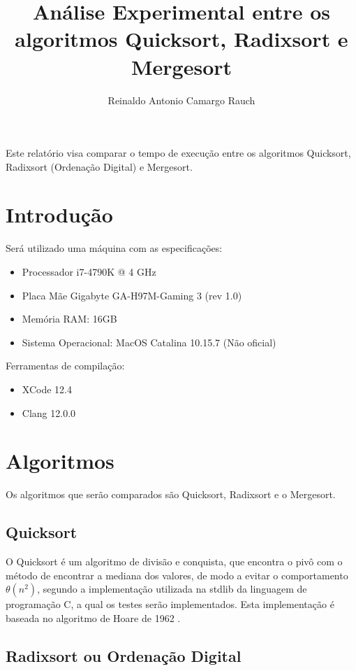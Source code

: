 \documentclass[12pt]{article}
\title{Análise Experimental entre os algoritmos Quicksort, Radixsort  e Mergesort}
\author{Reinaldo Antonio Camargo Rauch\inst{1}}
\begin{document}
\maketitle

\begin{resumo}
Este relatório visa comparar o tempo de execução entre os algoritmos Quicksort, Radixsort (Ordenação Digital) e Mergesort.
\end{resumo}

\section{Introdução}

Será utilizado uma máquina com as especificações:

\begin{itemize}
  \item Processador i7-4790K @ 4 GHz
  \item Placa Mãe Gigabyte GA-H97M-Gaming 3 (rev 1.0)
  \item Memória RAM: 16GB
  \item Sistema Operacional: MacOS Catalina 10.15.7 (Não oficial)
\end{itemize}


Ferramentas de compilação:

\begin{itemize}
  \item XCode 12.4
  \item Clang 12.0.0
\end{itemize}

\section{Algoritmos}

Os algoritmos que serão comparados são Quicksort, Radixsort e o Mergesort.

\subsection{Quicksort}

O Quicksort é um algoritmo de divisão e conquista, que encontra o pivô com o método de encontrar a mediana dos valores, de modo a evitar o comportamento $\theta{(n^2)}$, segundo a implementação utilizada na stdlib da linguagem de programação C, a qual os testes serão implementados. Esta implementação é baseada no algoritmo de Hoare de 1962 \cite{quicksort:21}.

\subsection{Radixsort ou Ordenação Digital}
\end{document}
